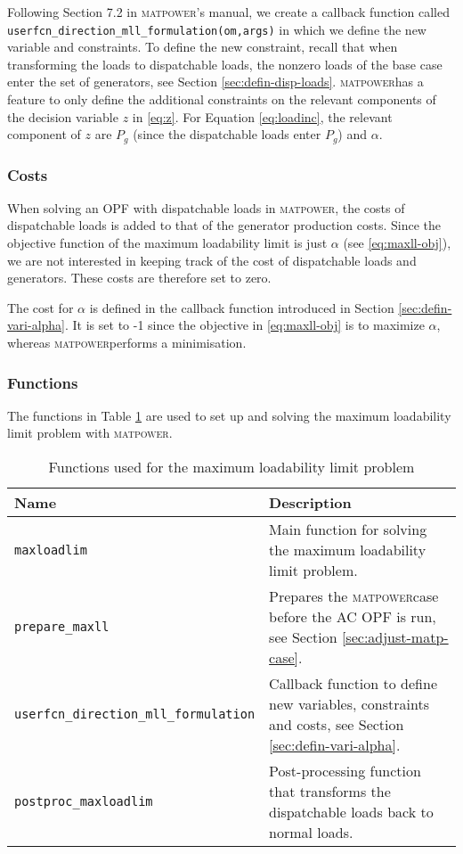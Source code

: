\documentclass[12pt,a4]{article}
\newcommand*{\codemat}[1]{\texttt{#1}}
\newcommand*{\matpower}{\textsc{matpower}}
\begin{document}
Following Section 7.2 in \matpower's manual, we create a callback function called \codemat{userfcn\_direction\_mll\_formulation(om,args)} in which we define the new variable and constraints.
To define the new constraint, recall that when transforming the loads to dispatchable loads, the nonzero loads of the base case enter the set of generators, see Section \ref{sec:defin-disp-loads}.
\matpower has a feature to only define the additional constraints on the relevant components of the decision variable $z$ in \eqref{eq:z}.
For Equation \eqref{eq:loadinc}, the relevant component of $z$ are $P_g$ (since the dispatchable loads enter $P_g$) and $\alpha$.

\subsubsection{Costs}
\label{sec:costs}

When solving an OPF with dispatchable loads in \matpower, the costs of dispatchable loads is added to that of the generator production costs.
Since the objective function of the maximum loadability limit is just $\alpha$ (see \eqref{eq:maxll-obj}), we are not interested in keeping track of the cost of dispatchable loads and generators.
These costs are therefore set to zero.

The cost for $\alpha$ is defined in the callback function introduced in Section \ref{sec:defin-vari-alpha}.
It is set to -1 since the objective in \eqref{eq:maxll-obj} is to maximize $\alpha$, whereas \matpower performs a minimisation.

\subsubsection{Functions}
\label{sec:functions}

The functions in Table \ref{tab:functions} are used to set up and solving the maximum loadability limit problem with \matpower.

\begin{table}[!h]
  \centering
  \begin{tabular}{lp{8cm}}
  \toprule
  Name  & Description \\
  \midrule
  \codemat{maxloadlim} & Main function for solving the maximum loadability limit problem.\\
  \codemat{prepare\_maxll} & Prepares the \matpower case before the AC OPF is run, see Section \ref{sec:adjust-matp-case}.\\
  \codemat{userfcn\_direction\_mll\_formulation} & Callback function to define new variables, constraints and costs, see Section \ref{sec:defin-vari-alpha}. \\
  \codemat{postproc\_maxloadlim} & Post-processing function that transforms the dispatchable loads back to normal loads.\\
  \bottomrule
  \end{tabular}
  \caption{Functions used for the maximum loadability limit problem}
  \label{tab:functions}
\end{table}
\end{document}
